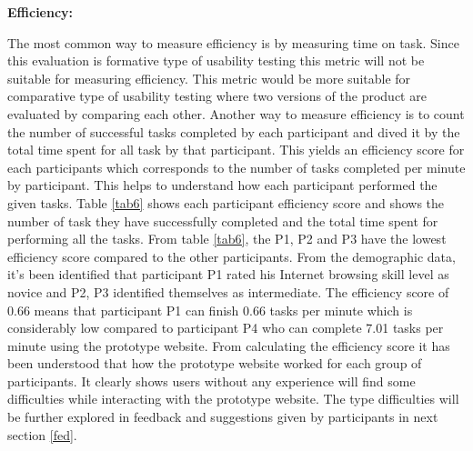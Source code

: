 \documentclass[mscthesis]{usiinfthesis}
\begin{document}
\textbf{Efficiency:}

The most common way to measure efficiency is by measuring time on task. Since this evaluation is formative type of usability testing this metric will not be suitable for measuring efficiency. This metric would be more suitable for comparative type of usability testing where two versions of the product are evaluated by comparing each other. Another way to measure efficiency is to count the number of successful tasks completed by each participant and dived it by the total time spent for all task by that participant. This yields an efficiency score for each participants which corresponds to the number of tasks completed per minute by participant. This helps to understand how each participant performed the given tasks. Table \ref{tab6} shows each participant efficiency score and shows the number of task they have successfully completed and the total time spent for performing all the tasks. From table \ref{tab6}, the P1, P2 and P3 have the lowest efficiency score compared to the other participants. From the demographic data, it's been identified that participant P1 rated his Internet browsing skill level as novice and P2, P3 identified themselves as intermediate. The efficiency score of 0.66 means that participant P1 can finish 0.66 tasks per minute which is considerably low compared to participant P4 who can complete 7.01 tasks per minute using the prototype website. From calculating the efficiency score it has been understood that how the prototype website worked for each group of participants. It clearly shows users without any experience will find some difficulties while interacting with the prototype website. The type difficulties will be further explored in feedback and suggestions given by participants in next section \ref{fed}. 
\end{document}
